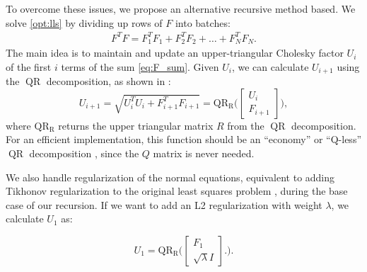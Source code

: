 \documentclass{article}
\begin{document}
To overcome these issues, we propose an alternative recursive method based. We solve
\eqref{opt:lls} by dividing up rows of $F$ into batches:
\begin{align} \label{eq:F_sum}
  F^T F = F_1^T F_1 + F_2^T F_2 + \ldots + F_N^T F_N.
\end{align}
The main idea is to maintain and update an upper-triangular Cholesky factor $U_i$ of the
first $i$ terms of the sum \eqref{eq:F_sum}. Given $U_i$, we can calculate $U_{i+1}$ using
the $\operatorname{QR}$ decomposition, as shown in
\cite{Howell2019}:
\begin{equation}
  U_{i+1} = \sqrt{U_i^TU_i + F_{i+1}^TF_{i+1}} = 
  \operatorname{QR_R}\bigg( \begin{bmatrix} {U_i} \\ {F_{i+1}} \end{bmatrix} \bigg),
\end{equation}
where $\operatorname{QR_R}$ returns the upper triangular matrix $R$ from the 
$\operatorname{QR}$ decomposition. For an efficient implementation, this function should be
an ``economy'' or ``Q-less'' $\operatorname{QR}$ decomposition \cite{cite something (e.g.
Van Loan)}, since the $Q$ matrix is never needed.

We also handle regularization of the normal equations, equivalent to adding Tikhonov
regularization to the original least squares problem , during the base
case of our recursion. If we want to add an L2 regularization with weight $\lambda$, we
calculate $U_1$ as:

\begin{equation}
  U_1 =  \operatorname{QR_R}\bigg( 
  \begin{bmatrix} {F_1} \\ \sqrt{\lambda} I \end{bmatrix}.
  \bigg).
\end{equation}
\end{document}
